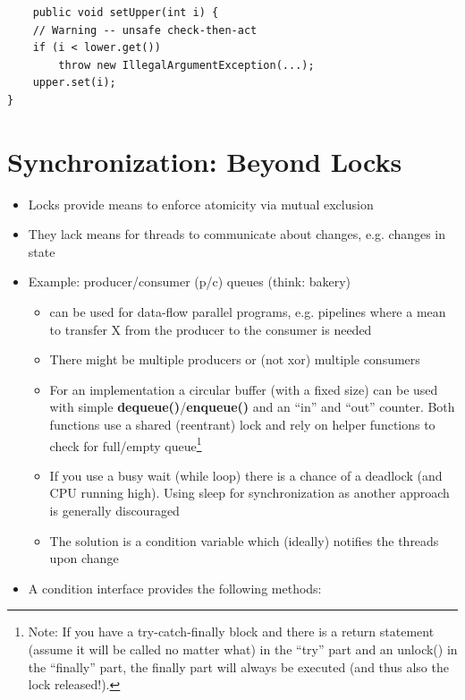 \documentclass[a4paper]{article}
\begin{document}
\begin{itemize}
\begin{itemize}
\begin{itemize}
\begin{lstlisting}
	public void setUpper(int i) {
	// Warning -- unsafe check-then-act
	if (i < lower.get())
		throw new IllegalArgumentException(...);
	upper.set(i);
}
						\end{lstlisting}
					\end{itemize}
			\end{itemize} 
	\end{itemize}




\setcounter{section}{10}%
\section{Synchronization: Beyond Locks}
\begin{itemize}
\item Locks provide means to enforce atomicity via mutual exclusion 
\item They lack means for threads to communicate about changes, e.g. changes in state
\item Example: producer/consumer (p/c) queues (think: bakery)
\begin{itemize}
\item can be used for data-flow parallel programs, e.g. pipelines where a mean to transfer X from the producer to the consumer is needed
\item There might be multiple producers or (not xor) multiple consumers
\item For an implementation a circular buffer (with a fixed size) can be used with simple \textbf{dequeue()}/\textbf{enqueue()} and an “in” and “out” counter. Both functions use a shared (reentrant) lock and rely on helper functions to check for full/empty queue\footnote{Note: If you have a try-catch-finally block and there is a return statement (assume it will be called no matter what) in the ``try'' part and an unlock() in the ``finally'' part, the finally part will always be executed (and thus also the lock released!).}
\item If you use a busy wait (while loop) there is a chance of a deadlock (and CPU running high). Using sleep for synchronization as another approach is generally discouraged
\item The solution is a condition variable which (ideally) notifies the threads upon change
\end{itemize}
\item A condition interface provides the following methods:

\end{itemize}
\end{document}

